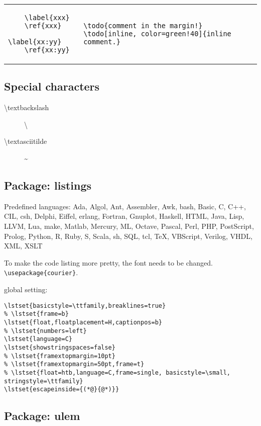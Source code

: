 \begin{tabular}{@{}l|l@{}}
  \begin{lstlisting}
    \label{xxx}
    \ref{xxx}
    \label{xx:yy}
    \ref{xx:yy}
  \end{lstlisting}&
\begin{lstlisting}
\todo{comment in the margin!}
\todo[inline, color=green!40]{inline comment.}
\end{lstlisting}
\end{tabular}

\subsection{Special characters}
\begin{description}
\item [\textbackslash textbackslash] \textbackslash
\item [\textbackslash textasciitilde] \textasciitilde
\end{description}




\subsection{Package: listings}
Predefined languages:
Ada, Algol, Ant, Assembler, Awk, bash, Basic, C, C++, CIL, csh,
Delphi, Eiffel, erlang, Fortran, Gnuplot, Haskell, HTML, Java, Lisp,
LLVM, Lua, make, Matlab, Mercury, ML, Octave, Pascal, Perl, PHP,
PostScript, Prolog, Python, R, Ruby, S, Scala, sh, SQL, tcl, TeX,
VBScript, Verilog, VHDL, XML, XSLT


To make the code listing more pretty, the font needs to be changed.
\verb$\usepackage{courier}$.

global setting:

\begin{lstlisting}
\lstset{basicstyle=\ttfamily,breaklines=true}
% \lstset{frame=b}
\lstset{float,floatplacement=H,captionpos=b}
% \lstset{numbers=left}
\lstset{language=C}
\lstset{showstringspaces=false}
% \lstset{framextopmargin=10pt}
% \lstset{framextopmargin=50pt,frame=t}
% \lstset{float=htb,language=C,frame=single, basicstyle=\small, stringstyle=\ttfamily}
\lstset{escapeinside={(*@}{@*)}}
\end{lstlisting}

\subsection{Package: ulem}

